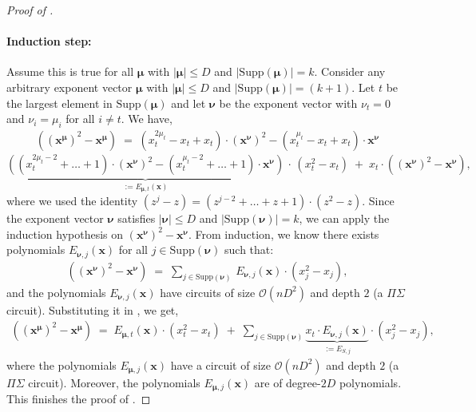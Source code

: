 \documentclass[11pt]{article}
\newcommand{\bigO}{\mathcal{O}}
\begin{document}
\begin{proof}[Proof of ]
\paragraph{Induction step:}Assume this is true for all $\bm{\mu}$ with $|\bm{\mu}| \leq D$ and $|\mathrm{Supp}(\bm{\mu})| = k$. Consider any arbitrary exponent vector $\bm{\mu}$ with $|\bm{\mu}| \leq D$ and $|\mathrm{Supp}(\bm{\mu})| = (k+1)$. Let $t$ be the largest element in $\mathrm{Supp}(\bm{\mu})$ and let $\bm{\nu}$ be the exponent vector with $\nu_{t} = 0$ and $\nu_{i} = \mu_{i}$ for all $i \neq t$. We have,
\begin{align*}
    ((\mathbf{x}^{\bm{\mu}})^{2} - \mathbf{x}^{\bm{\mu}}) \; = \;  (x_{t}^{2 \mu_{t}} - x_{t} + x_{t}) \cdot (\mathbf{x}^{\bm{\nu}})^{2} - (x_{t}^{\mu_{t}} - x_{t} + x_{t}) \cdot \mathbf{x}^{\bm{\nu}}
\end{align*}
\begin{equation}\label{eqn:monomial-axiom}
    \underbrace{((x_{t}^{2\mu_{t} - 2} + \ldots + 1) \cdot (\mathbf{x}^{\bm{\nu}})^{2} - (x_{t}^{\mu_{t}-2} + \ldots +1) \cdot \mathbf{x}^{\bm{\nu}})}_{:= E_{\bm{\mu},t}(\mathbf{x})} \, \cdot \, (x_{t}^{2} - x_{t}) \; + \; x_{t} \cdot ((\mathbf{x}^{\bm{\nu}})^{2} - \mathbf{x}^{\bm{\nu}}), 
\end{equation}
where we used the identity $(z^{j} - z) = (z^{j-2} + \ldots + z + 1) \cdot (z^{2} - z)$. Since the exponent vector $\bm{\nu}$ satisfies $|\bm{\nu}| \leq D$ and $|\mathrm{Supp}(\bm{\nu})| = k$, we can apply the induction hypothesis on $(\mathbf{x}^{\bm{\nu}})^{2} - \mathbf{x}^{\bm{\nu}}$. From induction, we know there exists polynomials $E_{\bm{\nu}, j}(\mathbf{x})$ for all $j \in \mathrm{Supp}(\bm{\nu})$ such that:
\begin{align*}
    ((\mathbf{x}^{\bm{\nu}})^{2} - \mathbf{x}^{\bm{\nu}}) \; = \; \sum_{j \in \mathrm{Supp}(\bm{\nu})} \, E_{\bm{\nu},j}(\mathbf{x}) \cdot (x_{j}^{2} - x_{j}),
\end{align*}
and the polynomials $E_{\bm{\nu},j}(\mathbf{x})$ have circuits of size $\bigO(nD^{2})$ and depth $2$ (a $\Pi \Sigma$ circuit). Substituting it in , we get,
\begin{align*}
   ((\mathbf{x}^{\bm{\mu}})^{2} - \mathbf{x}^{\bm{\mu}}) \; = \; E_{\bm{\mu},t}(\mathbf{x}) \cdot (x_{t}^{2} - x_{t}) \; + \; \sum_{j \in \mathrm{Supp}(\bm{\nu})} \underbrace{x_{t} \cdot E_{\bm{\nu},j}(\mathbf{x})}_{:= E_{S,j}} \cdot (x_{j}^{2} - x_{j}),
\end{align*}
where the polynomials $E_{\bm{\mu},j}(\mathbf{x})$ have a circuit of size $\bigO(nD^{2})$ and depth $2$ (a $\Pi \Sigma$ circuit). Moreover, the polynomials $E_{\bm{\mu},j}(\mathbf{x})$ are of degree-$2D$ polynomials. This finishes the proof of .
\end{proof}
\end{document}
